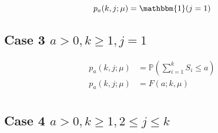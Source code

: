 \documentclass{article}
\begin{document}
\begin{equation*}
	p_{a} (k, j; \mu) = \mathbbm{1} (j = 1) \\
\end{equation*}

\subsection{Case 3 $a > 0, k \geq 1, j = 1$}

\begin{align*}
	p_{a} (k, j; \mu) & = \mathbb{P} \left( \sum_{i = 1}^{k} S_{i} \leq a \right) \\
	p_{a} (k, j; \mu) & = F (a; k, \mu) \\
\end{align*}

\subsection{Case 4 $a > 0, k \geq 1, 2 \leq j \leq k$}
\end{document}
